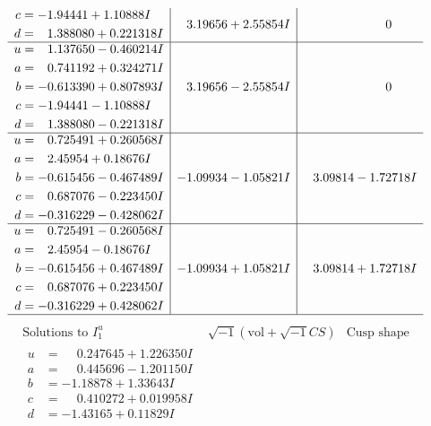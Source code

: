 \documentclass[1p]{elsarticle_modified}
\theoremstyle{definition}
\newcommand{\I}{\sqrt{-1}}
\begin{document}
$$\begin{array}{c|c|c}
\begin{aligned}
c &= -1.94441 + 1.10888 I \\
d &= \phantom{-}1.388080 + 0.221318 I\end{aligned}
 & \phantom{-}3.19656 + 2.55854 I & \phantom{-0.000000 } 0 \\ \hline\begin{aligned}
u &= \phantom{-}1.137650 - 0.460214 I \\
a &= \phantom{-}0.741192 + 0.324271 I \\
b &= -0.613390 + 0.807893 I \\
c &= -1.94441 - 1.10888 I \\
d &= \phantom{-}1.388080 - 0.221318 I\end{aligned}
 & \phantom{-}3.19656 - 2.55854 I & \phantom{-0.000000 } 0 \\ \hline\begin{aligned}
u &= \phantom{-}0.725491 + 0.260568 I \\
a &= \phantom{-}2.45954 + 0.18676 I \\
b &= -0.615456 - 0.467489 I \\
c &= \phantom{-}0.687076 - 0.223450 I \\
d &= -0.316229 - 0.428062 I\end{aligned}
 & -1.09934 - 1.05821 I & \phantom{-}3.09814 - 1.72718 I \\ \hline\begin{aligned}
u &= \phantom{-}0.725491 - 0.260568 I \\
a &= \phantom{-}2.45954 - 0.18676 I \\
b &= -0.615456 + 0.467489 I \\
c &= \phantom{-}0.687076 + 0.223450 I \\
d &= -0.316229 + 0.428062 I\end{aligned}
 & -1.09934 + 1.05821 I & \phantom{-}3.09814 + 1.72718 I\\
 \hline 
 \end{array}$$\newpage$$\begin{array}{c|c|c}  
\text{Solutions to }I^u_{1}& \I (\text{vol} + \sqrt{-1}CS) & \text{Cusp shape}\\
 \hline 
\begin{aligned}
u &= \phantom{-}0.247645 + 1.226350 I \\
a &= \phantom{-}0.445696 - 1.201150 I \\
b &= -1.18878 + 1.33643 I \\
c &= \phantom{-}0.410272 + 0.019958 I \\
d &= -1.43165 + 0.11829 I\end{aligned}

\end{array}$$
\end{document}
